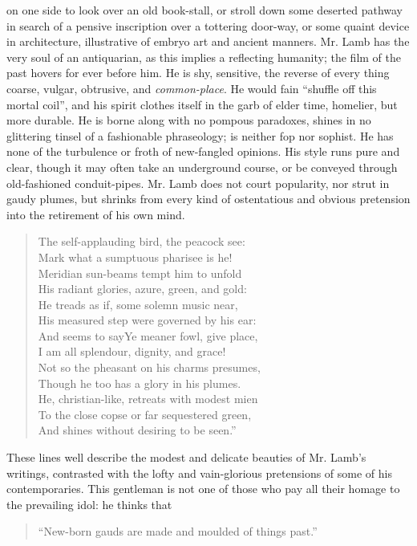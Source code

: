 on one side to look over an old book-stall, or stroll down some
deserted pathway in search of a pensive inscription over a
tottering door-way, or some quaint device in architecture,
illustrative of embryo art and ancient manners. Mr. Lamb has the
very soul of an antiquarian, as this implies a reflecting
humanity; the film of the past hovers for ever before him. He is
shy, sensitive, the reverse of every thing coarse, vulgar,
obtrusive, and \emph{common-place}. He would fain ``shuffle off
this mortal coil'', and his spirit clothes itself in the garb of
elder time, homelier, but more durable. He is borne along with no
pompous paradoxes, shines in no glittering tinsel of a fashionable
phraseology; is neither fop nor sophist. He has none of the
turbulence or froth of new-fangled opinions. His style runs pure
and clear, though it may often take an underground course, or be
conveyed through old-fashioned conduit-pipes. Mr. Lamb does not
court popularity, nor strut in gaudy plumes, but shrinks from
every kind of ostentatious and obvious pretension into the
retirement of his own mind.
\begin{verse}
  The self-applauding bird, the peacock see:\textemdash \\
  Mark what a sumptuous pharisee is he!\\
  Meridian sun-beams tempt him to unfold\\
  His radiant glories, azure, green, and gold:\\
  He treads as if, some solemn music near,\\
  His measured step were governed by his ear:\\
  And seems to say\textemdash Ye meaner fowl, give place,\\
  I am all splendour, dignity, and grace!\\
  Not so the pheasant on his charms presumes,\\
  Though he too has a glory in his plumes.\\
  He, christian-like, retreats with modest mien\\
  To the close copse or far sequestered green,\\
  And shines without desiring to be seen.''
\end{verse}
These lines well describe the modest and delicate beauties of
Mr. Lamb's writings, contrasted with the lofty and vain-glorious
pretensions of some of his contemporaries. This gentleman is not
one of those who pay all their homage to the prevailing idol: he
thinks that
\begin{quote}
  ``New-born gauds are made and moulded of things past.''
\end{quote}
